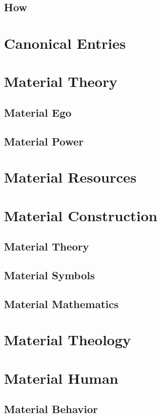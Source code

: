 \documentclass[UTF8]{article}
\begin{document}
	\subsection{How}
	
	\section{Canonical Entries}
	
	\section{Material Theory}
	\subsection{Material Ego}
	\subsection{Material Power}

	\section{Material Resources}
	
	\section{Material Construction}
	\subsection{Material Theory}
	\subsection{Material Symbols}
	\subsection{Material Mathematics}
	
	\section{Material Theology}
	
	\section{Material Human}
	\subsection{Material Behavior}
\end{document}
